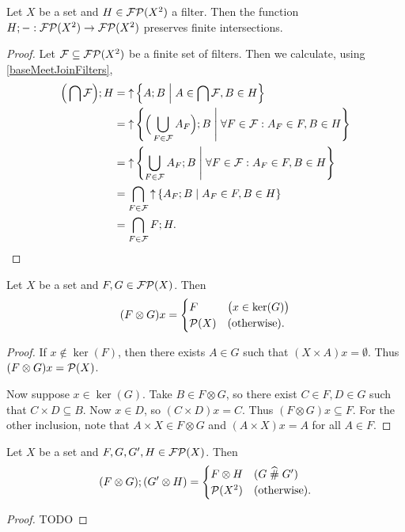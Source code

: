 \begin{proposition} \label{filterCompositionResidual}
Let $X$ be a set and $H\in\operatorname{\mathcal{FP}}(X^2)$ a filter. Then the function $H;-: \operatorname{\mathcal{FP}}(X^2) \to \operatorname{\mathcal{FP}}(X^2)$ preserves finite intersections.
\end{proposition}
\begin{proof}
Let $\mathcal{F}\subseteq \operatorname{\mathcal{FP}}(X^2)$ be a finite set of filters. Then we calculate, using \ref{baseMeetJoinFilters},
\begin{align*}
\Big(\bigcap \mathcal{F}\Big); H &= \upset\setbuilder{A;B}{A\in \bigcap \mathcal{F}, B\in H} \\
&= \upset\setbuilder{\Big(\bigcup_{F\in \mathcal{F}}A_F\Big);B}{\forall F\in\mathcal{F}: A_F\in F, B\in H} \\
&= \upset\setbuilder{\bigcup_{F\in \mathcal{F}}A_F;B}{\forall F\in\mathcal{F}: A_F\in F, B\in H} \\
&= \bigcap_{F\in \mathcal{F}} \upset\setbuilder{A_F; B}{A_F\in F, B\in H} \\
&= \bigcap_{F\in \mathcal{F}} F;H.
\end{align*}
\end{proof}

\begin{lemma} \label{principalImageProductFilter}
Let $X$ be a set and $F,G\in\operatorname{\mathcal{FP}}(X)$. Then
\[ (F\otimes G)x = \begin{cases}
F & \big(x\in\ker(G)\big) \\
\operatorname{\mathcal{P}}(X) & (\text{otherwise}).
\end{cases} \]
\end{lemma}
\begin{proof}
If $x\notin\ker(F)$, then there exists $A\in G$ such that $(X\times A)x = \emptyset$. Thus $(F\otimes G)x = \operatorname{\mathcal{P}}(X)$.

Now suppose $x\in\ker(G)$. Take $B\in F\otimes G$, so there exist $C\in F, D\in G$ such that $C\times D \subseteq B$. Now $x\in D$, so $(C\times D)x = C$. Thus $(F\otimes G)x \subseteq F$. For the other inclusion, note that $A\times X\in F\otimes G$ and $(A\times X)x = A$ for all $A\in F$.
\end{proof}

\begin{lemma} \label{compositionProductFilters}
Let $X$ be a set and $F,G, G', H\in\operatorname{\mathcal{FP}}(X)$. Then
\[ (F\otimes G);(G'\otimes H) = \begin{cases}
F\otimes H & (G\mathrel{\widehat{\#}} G') \\
\operatorname{\mathcal{P}}(X ^2) & (\text{otherwise}).
\end{cases}  \]
\end{lemma}
\begin{proof}
TODO
\end{proof}

